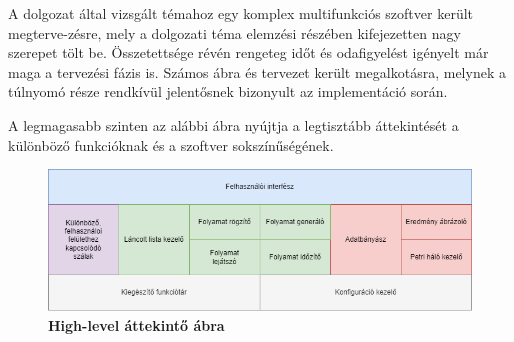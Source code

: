 
A dolgozat által vizsgált témahoz egy komplex multifunkciós szoftver került megterve\hyp{}zésre, mely a dolgozati téma elemzési részében kifejezetten nagy szerepet tölt be. Összetettsége révén rengeteg időt és odafigyelést igényelt már maga a tervezési fázis is. Számos ábra és tervezet került megalkotásra, melynek a túlnyomó része rendkívül jelentősnek bizonyult az implementáció során.


A legmagasabb szinten az alábbi ábra nyújtja a legtisztább áttekintését a különböző funkcióknak és a szoftver sokszínűségének.

\begin{figure}[h!]
\begin{center}
\includegraphics[width=\textwidth,keepaspectratio=true]{images/img_plan_1}
\caption{\textbf{High-level áttekintő ábra}}
\label{fig:plan}
\end{center}
\end{figure}

